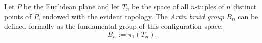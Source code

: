 Let $P$ be the Euclidean plane and let $T_n$ be the space of all $n$-tuples of $n$ distinct points of $P$, endowed with the evident topology. The \emph{Artin braid group} $B_n$ can be defined formally as the fundamental group of this configuration space:
$$
B_n := \pi_1(T_n).
$$
